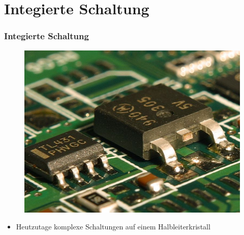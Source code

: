 \section*{Integierte Schaltung}
\begin{frame}
\frametitle{Integierte Schaltung}
\begin{minipage}{0.3\textwidth}
	 \begin{figure}
      \includegraphics[width=\textwidth,height=.6\textheight,keepaspectratio]{e13/IC.jpg}
    \end{figure}
\end{minipage}
\begin{minipage}{0.5\textwidth}
	\begin{itemize}
		\item Heutzutage komplexe Schaltungen auf einem Halbleiterkristall
	\end{itemize}


\end{minipage}
\end{frame}

